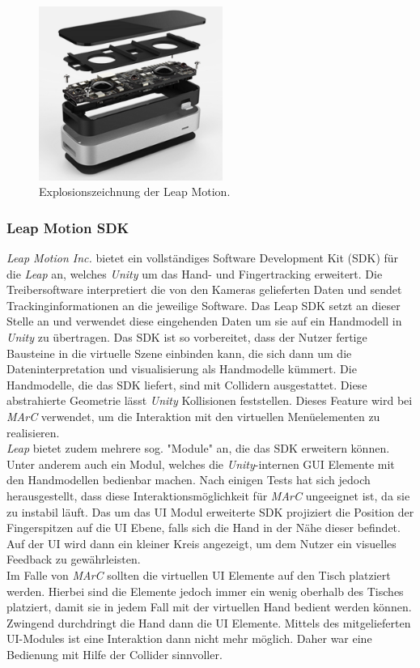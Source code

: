 \begin{figure}[H]
	\centering
	\includegraphics[width=6cm]{Bilder/leap-motion.png}			
		\caption{Explosionszeichnung der Leap Motion.~\cite{website:LeapMotionBlog}}
		\label{fig:leapMotion}
\end{figure}

\subsubsection{Leap Motion SDK} \label{sec:LeapSDK}
\textit{Leap Motion Inc.} bietet ein vollständiges Software Development Kit (SDK) für die \textit{Leap} an, welches \textit{Unity} um das Hand- und Fingertracking erweitert. Die Treibersoftware interpretiert die von den Kameras gelieferten Daten und sendet Trackinginformationen an die jeweilige Software. Das Leap SDK setzt an dieser Stelle an und verwendet diese eingehenden Daten um sie auf ein Handmodell in \textit{Unity} zu übertragen. Das SDK ist so vorbereitet, dass der Nutzer fertige Bausteine in die virtuelle Szene einbinden kann, die sich dann um die Dateninterpretation und visualisierung als Handmodelle kümmert. Die Handmodelle, die das SDK liefert, sind mit Collidern ausgestattet. Diese abstrahierte Geometrie lässt \textit{Unity} Kollisionen feststellen. Dieses Feature wird bei \textit{MArC} verwendet, um die Interaktion mit den virtuellen Menüelementen zu realisieren.\\
\textit{Leap} bietet zudem mehrere sog. "Module" an, die das SDK erweitern können. Unter anderem auch ein Modul, welches die \textit{Unity}-internen GUI Elemente mit den Handmodellen bedienbar machen. Nach einigen Tests hat sich jedoch herausgestellt, dass diese Interaktionsmöglichkeit für \textit{MArC} ungeeignet ist, da sie zu instabil läuft. Das um das UI Modul erweiterte SDK projiziert die Position der Fingerspitzen auf die UI Ebene, falls sich die Hand in der Nähe dieser befindet. Auf der UI wird dann ein kleiner Kreis angezeigt, um dem Nutzer ein visuelles Feedback zu gewährleisten.\\
Im Falle von \textit{MArC} sollten die virtuellen UI Elemente auf den Tisch platziert werden. Hierbei sind die Elemente jedoch immer ein wenig oberhalb des Tisches platziert, damit sie in jedem Fall mit der virtuellen Hand bedient werden können. Zwingend durchdringt die Hand dann die UI Elemente. Mittels des mitgelieferten UI-Modules ist eine Interaktion dann nicht mehr möglich. Daher war eine Bedienung mit Hilfe der Collider sinnvoller.


